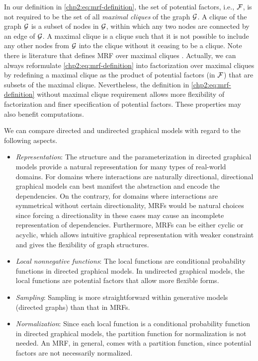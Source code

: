 \begin{remark}
In our definition in \eqref{chp2:eq:mrf-definition}, the set of potential factors, i.e., $\mathcal{F}$, is not required to be the set of all \textit{maximal cliques} of the graph $\mathcal{G}$. A clique of the graph $\mathcal{G}$ is a subset of nodes in $\mathcal{G}$, within which any two nodes are connected by an edge of $\mathcal{G}$. A maximal clique is a clique such that it is not possible to include any other nodes from $\mathcal{G}$ into the clique without it ceasing to be a clique. Note there is literature that defines MRF over maximal cliques \cite[section~8.3.2]{Bishop:2006:PRM:1162264}. Actually, we can always reformulate \eqref{chp2:eq:mrf-definition} into factorization over maximal cliques by redefining a maximal clique as the product of potential factors (in $\mathcal{F}$) that are subsets of the maximal clique. Nevertheless, the definition in \eqref{chp2:eq:mrf-definition} without maximal clique requirement allows more flexibility of factorization and finer specification of potential factors. These properties may also benefit computations.
\end{remark}

\begin{remark}
  We can compare directed and undirected graphical models with regard to the following aspects.
  \begin{itemize}
  \item \textit{Representation}: The structure and the parameterization in directed graphical models provide a natural representation for many types of real-world domains. For domains where interactions are naturally directional, directional graphical models can best manifest the abstraction and encode the dependencies. On the contrary, for domains where interactions are symmetrical without certain directionality, MRFs would be natural choices since forcing a directionality in these cases may cause an incomplete representation of dependencies. Furthermore, MRFs can be either cyclic or acyclic, which allows intuitive graphical representation with weaker constraint and gives the flexibility of graph structures.
  \item \textit{Local nonnegative functions}: The local functions are conditional probability functions in directed graphical models. In undirected graphical models, the local functions are potential factors that allow more flexible forms.
  \item \textit{Sampling}: Sampling is more straightforward within generative models (directed graphs) than that in MRFs.
  \item \textit{Normalization}: Since each local function is a conditional probability function in directed graphical models, the partition function for normalization is not needed. An MRF, in general, comes with a partition function, since potential factors are not necessarily normalized.
  \end{itemize}
\end{remark}

